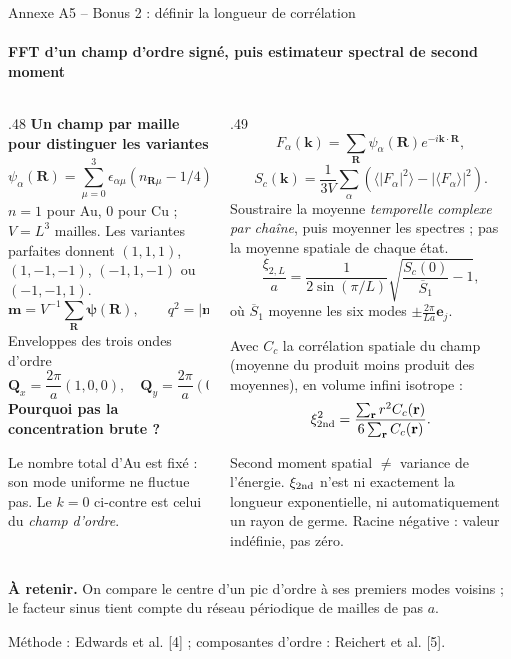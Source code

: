 \documentclass[aspectratio=169,10pt]{beamer}
\newcommand{\notecrit}[1]{\par\smallskip{\color{gold}\bfseries Lecture critique.} #1\par}
\newcommand{\takeaway}[1]{\par\smallskip\colorbox{pale}{\parbox{\dimexpr\linewidth-2\fboxsep\relax}{\strut\textbf{À retenir.} #1\strut}}}
\newcommand{\src}[1]{{\fontsize{6.5}{7.5}\selectfont\color{teal}#1\par}}
\begin{document}
\begin{frame}[t]{Annexe A5 -- Bonus 2 : définir la longueur de corrélation}
\framesubtitle{FFT d'un champ d'ordre signé, puis estimateur spectral de second moment}
\begin{columns}[T,onlytextwidth]
\begin{column}{.48\textwidth}
\textbf{Un champ par maille pour distinguer les variantes}
\[
\psi_\alpha(\mathbf R)=\sum_{\mu=0}^3\epsilon_{\alpha\mu}(n_{\mathbf R\mu}-1/4),
\quad\epsilon=\begin{pmatrix}1&1&-1&-1\\1&-1&1&-1\\1&-1&-1&1\end{pmatrix}.
\]
$n=1$ pour Au, 0 pour Cu ; $V=L^3$ mailles.
Les variantes parfaites donnent $(1,1,1)$, $(1,-1,-1)$,
$(-1,1,-1)$ ou $(-1,-1,1)$.
\[
\mathbf m=V^{-1}\sum_{\mathbf R}\boldsymbol\psi(\mathbf R),
\qquad q^2=|\mathbf m|^2/3.
\]
Enveloppes des trois ondes d'ordre
\[
\mathbf Q_x=\frac{2\pi}a(1,0,0),\quad\mathbf Q_y=\frac{2\pi}a(0,1,0),\quad\mathbf Q_z=\frac{2\pi}a(0,0,1).
\]
\textbf{Pourquoi pas la concentration brute ?}

Le nombre total d'Au est fixé : son mode uniforme ne fluctue pas. Le $k=0$ ci-contre est celui du \emph{champ d'ordre}.
\end{column}
\begin{column}{.49\textwidth}
\[
F_\alpha(\mathbf k)=\sum_{\mathbf R}\psi_\alpha(\mathbf R)e^{-i\mathbf k\cdot\mathbf R},
\]
\[
S_c(\mathbf k)=\frac1{3V}\sum_\alpha
\left(\langle|F_\alpha|^2\rangle-|\langle F_\alpha\rangle|^2\right).
\]
Soustraire la moyenne \emph{temporelle complexe par chaîne}, puis moyenner les spectres ; pas la moyenne spatiale de chaque état.
\[
\boxed{\frac{\xi_{2,L}}a=\frac1{2\sin(\pi/L)}\sqrt{\frac{S_c(0)}{\overline S_1}-1}},
\]
où $\overline S_1$ moyenne les six modes $\pm\frac{2\pi}{La}\mathbf e_j$.

Avec $C_c$ la corrélation spatiale du champ (moyenne du produit moins produit des moyennes), en volume infini isotrope :
\[
\xi_{\rm 2nd}^2=\frac{\sum_{\mathbf r}r^2C_c(\mathbf r)}{6\sum_{\mathbf r}C_c(\mathbf r)}.
\]
\notecrit{Second moment spatial $\neq$ variance de l'énergie. $\xi_{\rm 2nd}$ n'est ni exactement la longueur exponentielle, ni automatiquement un rayon de germe. Racine négative : valeur indéfinie, pas zéro.}
\end{column}
\end{columns}
\takeaway{On compare le centre d'un pic d'ordre à ses premiers modes voisins ; le facteur sinus tient compte du réseau périodique de mailles de pas $a$.}
\src{Méthode : Edwards et al. [4] ; composantes d'ordre : Reichert et al. [5].}
\end{frame}
\end{document}
